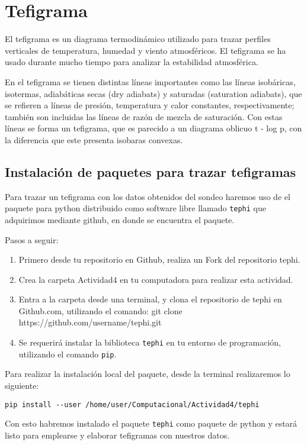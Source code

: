 \section{Tefigrama}
\noindent El tefigrama es un diagrama termodinámico utilizado para trazar perfiles verticales de temperatura, humedad y viento atmosféricos. El tefigrama se ha usado durante mucho tiempo para analizar la estabilidad atmosférica.

En el tefigrama se tienen distintas líneas importantes como las líneas isobáricas, isotermas, adiabáticas secas (dry adiabats) y saturadas (saturation adiabats), que se refieren a líneas de presión, temperatura y calor constantes, respectivamente; también son incluidas las líneas de razón de mezcla de saturación. Con estas líneas se forma un tefigrama, que es parecido a un diagrama oblicuo t - log p, con la diferencia que este presenta isobaras convexas.

\subsection{Instalación de paquetes para trazar tefigramas}
Para trazar un tefigrama con los datos obtenidos del sondeo haremos uso de el paquete para python distribuido como software libre llamado \texttt{tephi} que adquirimos mediante github, en donde se encuentra el paquete. 

Pasos a seguir:
\begin{enumerate}
\item Primero desde tu repositorio en Github, realiza un \textsf{Fork} del repositorio tephi. 
\item Crea la carpeta Actividad4 en tu computadora para realizar esta actividad. 
\item Entra a la carpeta desde una terminal, y clona el repositorio de tephi en Github.com, utilizando el comando: git clone https://github.com/username/tephi.git
\item Se requerirá instalar la biblioteca \texttt{tephi} en tu entorno de programación, utilizando el comando \texttt{pip}.
\end{enumerate}
Para realizar la instalación local del paquete, desde la terminal realizaremos lo siguiente:

\verb#pip install --user /home/user/Computacional/Actividad4/tephi#

\medskip
Con esto habremos instalado el paquete \texttt{tephi} como paquete de python y estará listo para emplearse y elaborar tefigramas con nuestros datos.


